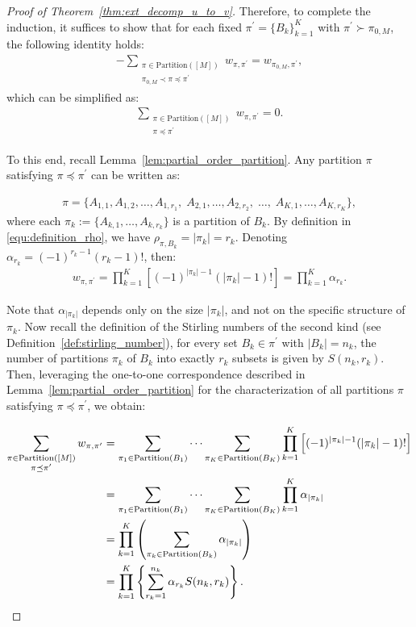 \documentclass[letterpaper,11pt]{article}
\newcommand{\partition}{\mathrm{Partition}}
\newcommand{\partitionp}[1]{\partition(#1)}
\newcommand{\pleq}{\preceq}
\newcommand{\pless}{\prec}
\newcommand{\pgreater}{\succ}
\begin{document}
\begin{proof}[Proof of Theorem~\ref{thm:ext_decomp_u_to_v}]
Therefore, to complete the induction, it suffices to show that for each fixed $\pi^{\prime} = \{ B_k \}_{k=1}^{K}$ with $\pi^{\prime} \pgreater \pi_{0,M}$, the following identity holds:
\begin{align*}
   -  \sum_{\substack{ \pi \in \partitionp{[M]} \\ \pi_{0,M} \pless \pi \pleq \pi^{\prime} }}   w_{\pi, \pi^{\prime}}  =    w_{\pi_{0,M}, \pi^{\prime}},
\end{align*}
which can be simplified as:
\begin{align}\label{equ:decompose_U_to_V_final_weight}
    \sum_{\substack{ \pi \in \partitionp{[M]} \\  \pi \pleq \pi^{\prime} }}   w_{\pi, \pi^{\prime}}  = 0.
\end{align}

To this end, recall Lemma~\ref{lem:partial_order_partition}. Any partition $\pi$ satisfying $ \pi \pleq \pi^{\prime}$ can be written as:

\begin{align*}
    \pi = \{ A_{1,1}, A_{1,2}, \dots, A_{1,r_1},\; A_{2,1}, \dots, A_{2,r_2},\; \dots,\; A_{K,1}, \dots, A_{K,r_K} \},
\end{align*}
where each $\pi_k := \{ A_{k,1}, \dots, A_{k,r_k} \}$ is a partition of $B_k$. By definition in \eqref{equ:definition_rho}, we have $\rho_{\pi,B_k} =  |\pi_k| = r_k$.  Denoting $\alpha_{r_k} = (-1)^{r_k - 1} (r_k -1)!$, then:
\begin{align*}
    w_{\pi, \pi^{\prime}} =  \prod_{k=1}^{K} \left[ (-1)^{|\pi_k| - 1} (|\pi_k| -1)! \right] = \prod_{k=1}^{K}  \alpha_{r_k}.
\end{align*}

Note that $\alpha_{|\pi_k|}$ depends only on the size $ |\pi_k|$, and not on the specific structure of $\pi_k$. Now recall the definition of the Stirling numbers of the second kind (see Definition~\ref{def:stirling_number}), for every set $B_k \in \pi^{\prime}$ with $|B_k| = n_k$, the number of partitions $\pi_k$ of $B_k$ into exactly $r_k$ subsets is given by $S(n_k, r_k)$.
Then, leveraging the one-to-one correspondence described in Lemma~\ref{lem:partial_order_partition} for the characterization of all partitions $\pi$ satisfying $\pi \pleq \pi^{\prime}$, we obtain:

\begin{align}
    \sum_{\substack{ \pi \in \partitionp{[M]} \\  \pi \pleq \pi^{\prime} }}   w_{\pi, \pi^{\prime}}
    &=  \sum_{\pi_1 \in \partitionp{B_1}} \cdots \sum_{\pi_K \in \partitionp{B_K}} \prod_{k=1}^{K} \left[ (-1)^{| \pi_{k} | - 1} (| \pi_{k} | -1)! \right]  \notag \\
    & = \sum_{\pi_1 \in \partitionp{B_1}} \cdots \sum_{\pi_K \in \partitionp{B_K}} \prod_{k=1}^{K}  \alpha_{| \pi_{k} |} \notag \\
    & = \prod_{k=1}^{K}  \left( \sum_{\pi_k \in \partitionp{B_k}}    \alpha_{| \pi_{k} |} \right) \notag \\
    &= \prod_{k=1}^{K} \left\{  \sum_{r_k =1}^{n_k} \alpha_{r_k} S(n_k, r_k) \right\}. \label{equ:proof_U2V_final_step}
\end{align}


\end{proof}
\end{document}
